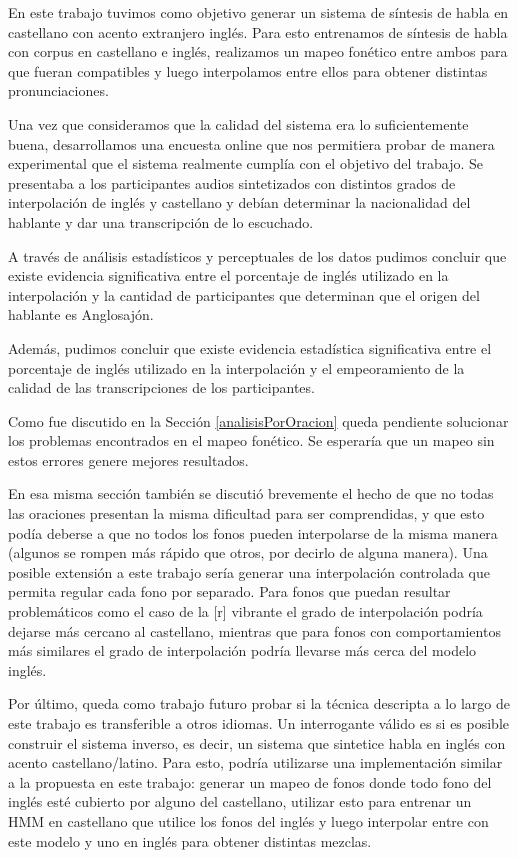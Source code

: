 En este trabajo tuvimos como objetivo generar un sistema de síntesis de habla en castellano con acento extranjero inglés. Para esto entrenamos  de síntesis de habla con corpus en castellano e inglés, realizamos un mapeo fonético entre ambos para que fueran compatibles y luego interpolamos entre ellos para obtener distintas pronunciaciones.

Una vez que consideramos que la calidad del sistema era lo suficientemente buena, desarrollamos una encuesta online que nos permitiera probar de manera experimental que el sistema realmente cumplía con el objetivo del trabajo. Se presentaba a los participantes audios sintetizados con distintos grados de interpolación de inglés y castellano y debían determinar la nacionalidad del hablante y dar una transcripción de lo escuchado.

A través de análisis estadísticos y perceptuales de los datos pudimos concluir que existe evidencia significativa entre el porcentaje de inglés utilizado en la interpolación y la cantidad de participantes que determinan que el origen del hablante es Anglosajón.

Además, pudimos concluir que existe evidencia estadística significativa entre el porcentaje de inglés utilizado en la interpolación y el empeoramiento de la calidad de las transcripciones de los participantes.

Como fue discutido en la Sección \ref{analisisPorOracion} queda pendiente solucionar los problemas encontrados en el mapeo fonético. Se esperaría que un mapeo sin estos errores genere mejores resultados.

En esa misma sección también se discutió brevemente el hecho de que no todas las oraciones presentan la misma dificultad para ser comprendidas, y que esto podía deberse a que no todos los fonos pueden interpolarse de la misma manera (algunos se rompen más rápido que otros, por decirlo de alguna manera). Una posible extensión a este trabajo sería generar una interpolación controlada que permita regular cada fono por separado. Para fonos que puedan resultar problemáticos como el caso de la [r] vibrante el grado de interpolación podría dejarse más cercano al castellano, mientras que para fonos con comportamientos más similares el grado de interpolación podría llevarse más cerca del modelo inglés.

Por último, queda como trabajo futuro probar si la técnica descripta a lo largo de este trabajo es transferible a otros idiomas. Un interrogante válido es si es posible construir el sistema inverso, es decir, un sistema que sintetice habla en inglés con acento castellano/latino. Para esto, podría utilizarse una implementación similar a la propuesta en este trabajo: generar un mapeo de fonos donde todo fono del inglés esté cubierto por alguno del castellano, utilizar esto para entrenar un HMM en castellano que utilice los fonos del inglés y luego interpolar entre con este modelo y uno en inglés para obtener distintas mezclas.